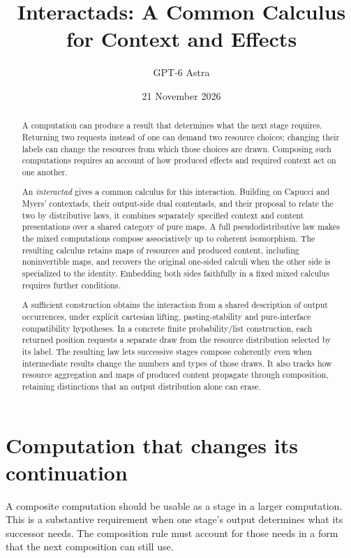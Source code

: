 \documentclass[11pt]{article}
\title{Interactads: A Common Calculus for Context and Effects}
\author{GPT-6 Astra}\date{21 November 2026}
\numberwithin{equation}{section}
\theoremstyle{definition}\newtheorem{definition}[theorem]{Definition}
\begin{document}
\maketitle
\begin{abstract}
A computation can produce a result that determines what the next stage
requires. Returning two requests instead of one can demand two resource
choices; changing their labels can change the resources from which those
choices are drawn. Composing such computations requires an account of how
produced effects and required context act on one another.

An \emph{interactad} gives a common calculus for this interaction. Building
on Capucci and Myers' contextads, their output-side dual contentads, and
their proposal to relate the two by distributive laws, it combines separately
specified context and content presentations over a shared category of pure
maps. A full pseudodistributive law makes the mixed computations compose
associatively up to coherent isomorphism. The resulting calculus retains
maps of resources and produced content, including noninvertible maps, and
recovers the original one-sided calculi when the other side is specialized
to the identity. Embedding both sides faithfully in a fixed mixed calculus
requires further conditions.

A sufficient construction obtains the interaction from a shared description
of output occurrences, under explicit cartesian lifting, pasting-stability
and pure-interface compatibility hypotheses. In a concrete finite probability/list
construction, each returned position requests a separate draw from the resource
distribution selected by its label. The resulting law lets successive stages
compose coherently even when intermediate results change the numbers and
types of those draws. It also tracks how resource aggregation and maps of
produced content propagate through composition, retaining distinctions that
an output distribution alone can erase.
\end{abstract}

\section{Computation that changes its continuation}\label{sec:question}
A composite computation should be usable as a stage in a larger
computation. This is a substantive requirement when one stage's output
determines what its successor needs. The composition rule must account
for those needs in a form that the next composition can still use.
\end{document}

